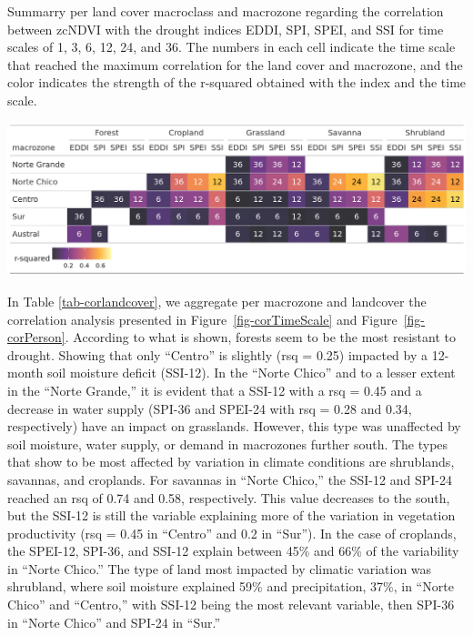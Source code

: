 \documentclass[
  authoryear,
  preprint,
  3p,
  onecolumn]{elsarticle}
\begin{document}
\begin{table}[!ht]
\caption{Summarry per land cover macroclass and macrozone regarding the correlation between zcNDVI with the drought indices EDDI, SPI, SPEI, and SSI for time scales of 1, 3, 6, 12, 24, and 36. The numbers in each cell indicate the time scale that reached the maximum correlation for the land cover and macrozone, and the color indicates the strength of the r-squared obtained with the index and the time scale.}
\label{tab-corlandcover}
\includegraphics[]{../output/figs/tabla_r_cor_macro_indice.png}
\end{table}

In Table \ref{tab-corlandcover}, we aggregate per macrozone and
landcover the correlation analysis presented in
Figure~\ref{fig-corTimeScale} and Figure~\ref{fig-corPerson}. According
to what is shown, forests seem to be the most resistant to drought.
Showing that only ``Centro'' is slightly (rsq = 0.25) impacted by a
12-month soil moisture deficit (SSI-12). In the ``Norte Chico'' and to a
lesser extent in the ``Norte Grande,'' it is evident that a SSI-12 with
a rsq = 0.45 and a decrease in water supply (SPI-36 and SPEI-24 with rsq
= 0.28 and 0.34, respectively) have an impact on grasslands. However,
this type was unaffected by soil moisture, water supply, or demand in
macrozones further south. The types that show to be most affected by
variation in climate conditions are shrublands, savannas, and croplands.
For savannas in ``Norte Chico,'' the SSI-12 and SPI-24 reached an rsq of
0.74 and 0.58, respectively. This value decreases to the south, but the
SSI-12 is still the variable explaining more of the variation in
vegetation productivity (rsq = 0.45 in ``Centro'' and 0.2 in ``Sur'').
In the case of croplands, the SPEI-12, SPI-36, and SSI-12 explain
between 45\% and 66\% of the variability in ``Norte Chico.'' The type of
land most impacted by climatic variation was shrubland, where soil
moisture explained 59\% and precipitation, 37\%, in ``Norte Chico'' and
``Centro,'' with SSI-12 being the most relevant variable, then SPI-36 in
``Norte Chico'' and SPI-24 in ``Sur.''
\end{document}

